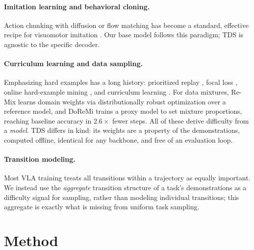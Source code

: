 \documentclass[letterpaper]{article} %
\newcommand{\tds}{TDS}
\begin{document}
\paragraph{Imitation learning and behavioral cloning.}
Action chunking with diffusion or flow matching has become a standard, effective recipe for visuomotor imitation \citep{chi2023diffusion,zhao2023aloha,lipman2023flow}. Our base model follows this paradigm; \tds{} is agnostic to the specific decoder.

\paragraph{Curriculum learning and data sampling.}
Emphasizing hard examples has a long history: prioritized replay \citep{schaul2016prioritized}, focal loss \citep{lin2017focal}, online hard-example mining \citep{shrivastava2016ohem}, and curriculum learning \citep{bengio2009curriculum}. For data mixtures, Re-Mix \citep{hejna2024remix} learns domain weights via distributionally robust optimization over a reference model, and DoReMi \citep{xie2023doremi} trains a proxy model to set mixture proportions, reaching baseline accuracy in $2.6\times$ fewer steps. All of these derive difficulty from a \emph{model}. \tds{} differs in kind: its weights are a property of the demonstrations, computed offline, identical for any backbone, and free of an evaluation loop.

\paragraph{Transition modeling.}
Most VLA training treats all transitions within a trajectory as equally important. We instead use the \emph{aggregate} transition structure of a task's demonstrations as a difficulty signal for sampling, rather than modeling individual transitions; this aggregate is exactly what is missing from uniform task sampling.

\section{Method}
\end{document}
